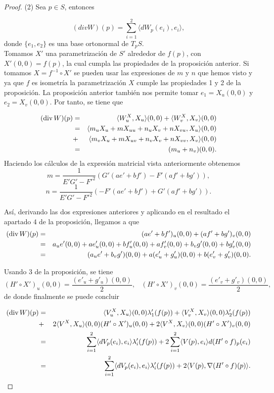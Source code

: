 \begin{proof}
	(2)  Sea $p \in S$, entonces
	
	\[
		(div W)(p) = \sum_{i=1}^{2}\langle dW_p(e_i), e_i \rangle,
	\]
	donde $\{e_1, e_2\}$ es una base ortonormal de $T_p S$.
	${ }$\\
	
	Tomamos $X'$ una parametrización de $S'$ alrededor de $f(p)$, con $X'(0,0) = f(p)$, la cual cumpla las propiedades de la proposición anterior. Si tomamos $X = f^{-1} \circ X'$ se pueden usar las expresiones de $m$ y $n$ que hemos visto y ya que $f$ es isometría la parametrización $X$ cumple las propiedades 1 y 2 de la proposición. La proposición anterior también nos permite tomar $e_1 = X_u(0,0)$ y $e_2 = X_v(0,0)$. Por tanto, se tiene que
	
		\begin{eqnarray*}
		(\hbox{div}\,W)(p)&=&\langle W^X_u,X_u\rangle(0,0)+\langle W^X_v,X_v\rangle(0,0)\\
		&=&\langle m_uX_u+mX_{uu}+n_uX_v+nX_{vu},X_u\rangle(0,0)\\
		&+&\langle m_vX_u+mX_{uv}+n_vX_v+nX_{vv},X_v\rangle(0,0)\\
		&=&(m_u+n_v)(0,0).
		\end{eqnarray*}
	${ }$\\
	
	Haciendo los cálculos de la expresión matricial vista anteriormente obtenemos
	${ }$\\
	
	\[
		m = \frac{1}{E'G' - F'^2} (G'(ae' + bf') - F'(af' + bg')),
	\]
	\[
		n = \frac{1}{E'G' - F'^2} (-F'(ae' + bf') + G'(af' + bg')).
	\]
	
	Así, derivando las dos expresiones anteriores y aplicando en el resultado el apartado 4 de la proposición, llegamos a que
	\begin{eqnarray*}
		(\hbox{div}\,W)(p)&=&(ae'+bf')_u(0,0)+(af'+bg')_v(0,0)\\
		&=& a_ue'(0,0)+ae'_u(0,0)+bf'_u(0,0)+af'_v(0,0)+b_vg'(0,0)+bg'_v(0,0)\\
		&=& (a_ue'+b_vg')(0,0)+a(e'_u+g'_u)(0,0)+b(e'_v+g'_v)(0,0).
	\end{eqnarray*}
	
	Usando 3 de la proposición, se tiene
	\[
		(H' \circ X')_u (0,0) = \frac{(e'_{u} + g'_{u})(0,0)}{2}, \;\;\; (H' \circ X')_v (0,0) = \frac{(e'_{v} + g'_{v})(0,0)}{2},
	\]
	${ }$\\
	de donde finalmente se puede concluir
	
	\begin{eqnarray*}
		(\hbox{div}\,W)(p)&=& \langle V^X_u,X_u\rangle(0,0) \lambda'_1(f(p))+\langle V^X_v,X_v\rangle(0,0) \lambda'_2(f(p))\\ &+& 2\langle V^X,X_u\rangle(0,0)(H'\circ X')_u(0,0)+2\langle V^X,X_v\rangle(0,0)(H'\circ X')_v(0,0)\\
		&=&\sum_{i=1}^2\langle dV_p(e_i),e_i\rangle\lambda'_i(f(p))+2\sum_{i=1}^2\langle V(p),e_i\rangle d(H'\circ f)_p(e_i)\\
		&=&\sum_{i=1}^2\langle dV_p(e_i),e_i\rangle\lambda'_i(f(p))+2\langle V(p),\nabla(H'\circ f)(p)\rangle.
	\end{eqnarray*}
\end{proof}
${ }$\\

